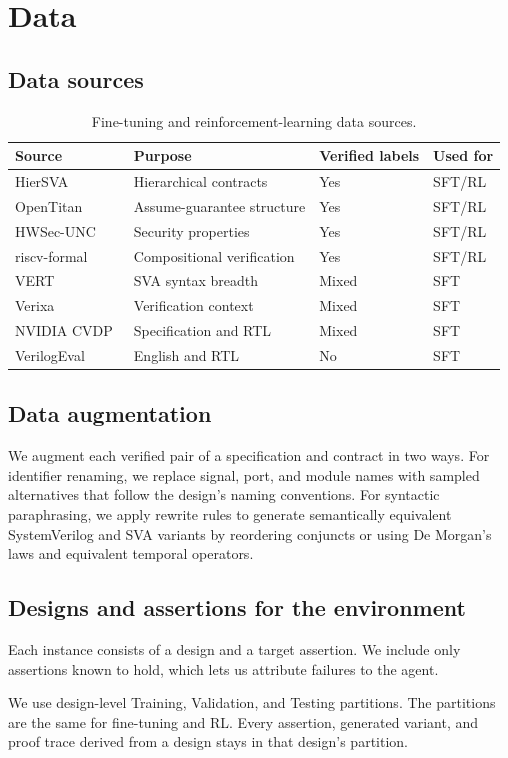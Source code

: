 \section{Data}
\label{sec:data}

\subsection{Data sources}
\label{sec:ft-sources}

\begin{table}[h]
\centering
\small
\begin{tabular}{llll}
\hline
Source & Purpose & Verified labels & Used for \\
\hline
HierSVA~\cite{hiersva2026} & Hierarchical contracts & Yes & SFT/RL \\
OpenTitan~\cite{opentitan} & Assume-guarantee structure & Yes & SFT/RL \\
HWSec-UNC~\cite{ahmad2024hwsec} & Security properties & Yes & SFT/RL \\
riscv-formal~\cite{riscvformal} & Compositional verification & Yes & SFT/RL \\
VERT~\cite{menon2025vert} & SVA syntax breadth & Mixed & SFT \\
Verixa~\cite{verixa2025} & Verification context & Mixed & SFT \\
NVIDIA CVDP~\cite{nvidiacvdp2025} & Specification and RTL & Mixed & SFT \\
VerilogEval~\cite{liu2023verilogeval} & English and RTL & No & SFT \\
\hline
\end{tabular}
\caption{Fine-tuning and reinforcement-learning data sources.}
\label{tab:ft-sources}
\end{table}

\subsection{Data augmentation}
\label{sec:ft-augmentation}

We augment each verified pair of a specification and contract in two ways.
For identifier renaming, we replace signal, port, and module names with sampled alternatives that follow the design's naming conventions.
For syntactic paraphrasing, we apply rewrite rules to generate semantically equivalent SystemVerilog and SVA variants by reordering conjuncts or using De Morgan's laws and equivalent temporal operators.

\subsection{Designs and assertions for the environment}
\label{sec:rl-instances}

Each instance consists of a design and a target assertion. We include only
assertions known to hold, which lets us attribute failures to the agent.

We use design-level Training, Validation, and Testing partitions.
The partitions are the same for fine-tuning and RL.
Every assertion, generated variant, and proof trace derived from a design stays in that design's partition.
